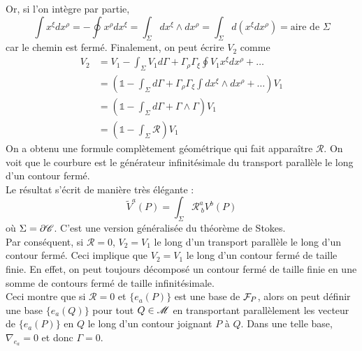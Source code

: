 \documentclass[a4paper,11pt]{report}
\begin{document}
                Or, si l'on intègre par partie,
                \begin{equation}
                    \int x^\xi dx^\rho = -\oint x^\rho dx^\xi = \int_\Sigma dx^\xi\wedge dx^\rho = \int_\Sigma d(x^\xi dx^\rho) = \text{aire de }\Sigma
                \end{equation}
                car le chemin est fermé. Finalement, on peut écrire $V_2$ comme
                \begin{align}
                    V_2 &= V_1-\int_\Sigma V_1 d\Gamma + \Gamma_\rho\Gamma_\xi\oint V_1x^\xi dx^\rho +\dots\\
                    &= \left( \mathbb{1}-\int_\Sigma d\Gamma + \Gamma_\rho\Gamma_\xi \int dx^\xi\wedge dx^\rho+\dots \right)V_1 \\
                    &= \left( \mathbb{1}-\int_\Sigma d\Gamma+\Gamma\wedge\Gamma \right)V_1 \\
                    &= \left( \mathbb{1}-\int_\Sigma \mathscr{R} \right)V_1
                \end{align}
                On a obtenu une formule complètement géométrique qui fait apparaître $\mathscr{R}$. On voit que le courbure est le générateur infinitésimale du transport parallèle le long d'un contour fermé.\\
                
                Le résultat s'écrit de manière très élégante :
                \begin{equation}
                    \widetilde{V}^a(P) = \int_\Sigma \mathscr{R}^a_{~b} V^b(P)
                \end{equation}
                où $\Sigma = \partial\mathscr{C}$. C'est une version généralisée du théorème de Stokes.\\
                
                Par conséquent, si $\mathscr{R} = 0$, $V_2 = V_1$ le long d'un transport parallèle le long d'un contour fermé. Ceci implique que $V_2 = V_1$ le long d'un contour fermé de taille finie. En effet, on peut toujours décomposé un contour fermé de taille finie en une somme de contours fermé de taille infinitésimale.\\
                
                Ceci montre que si $\mathscr{R} = 0$ et $\{e_a(P)\}$ est une base de $\mathcal{F}_P$, alors on peut définir une base $\{e_a(Q)\}$ pour tout $Q\in\mathscr{M}$ en transportant parallèlement les vecteur de $\{e_a(P)\}$ en $Q$ le long d'un contour joignant $P$ à $Q$. Dans une telle base, $\nabla_{e_a} = 0$ et donc $\Gamma = 0$.\\
                
\end{document}
